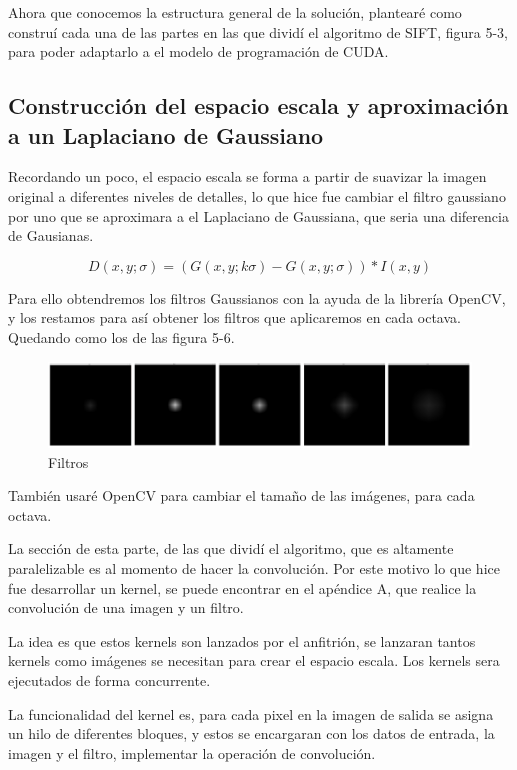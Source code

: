 Ahora que conocemos la estructura general de la solución, plantearé como construí cada una de las partes en las que dividí el algoritmo de SIFT, figura 5-3,  para poder adaptarlo a el modelo de programación de CUDA.

\subsection{Construcción del espacio escala y aproximación a un Laplaciano de Gaussiano}

Recordando un poco, el espacio escala se forma a partir de suavizar la imagen original a diferentes niveles de detalles, lo que hice fue cambiar el filtro gaussiano por uno que se aproximara a el Laplaciano de Gaussiana, que seria una diferencia de Gausianas. 

$$D(x,y;\sigma) = (G(x,y;k\sigma) - G(x,y;\sigma)) * I(x,y)$$ 

Para ello obtendremos los filtros Gaussianos con la ayuda de la librería OpenCV, y los restamos para así obtener los filtros que aplicaremos en cada octava. Quedando como los de las figura 5-6.


\begin{figure}[h]
			\centering
				\includegraphics[scale=0.2]{img/DoG.jpg}
			\caption{Filtros}
\end{figure}



 


También usaré OpenCV para cambiar el tamaño de las imágenes, para cada octava.

La sección de esta parte, de las que dividí el algoritmo, que es altamente paralelizable es al momento de hacer la convolución. Por este motivo lo que hice fue desarrollar un kernel, se puede encontrar en el apéndice A, que realice la convolución de una imagen y un filtro.

\pagebreak
 
La idea es que estos kernels son lanzados por el anfitrión, se lanzaran tantos kernels como imágenes se necesitan para crear el espacio escala. Los kernels sera ejecutados de forma concurrente. 

La funcionalidad del kernel es, para cada pixel en la imagen de salida se asigna un hilo de diferentes bloques, y estos se encargaran con los datos de entrada, la imagen y el filtro, implementar la operación de convolución.\\

